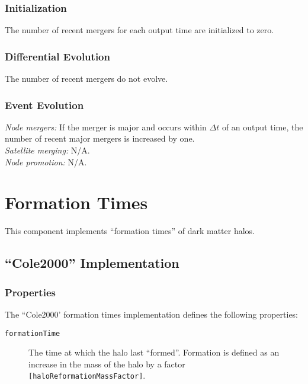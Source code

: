 \subsubsection{Initialization}

The number of recent mergers for each output time are initialized to zero.

\subsubsection{Differential Evolution}

The number of recent mergers do not evolve.

\subsubsection{Event Evolution}

\noindent\emph{Node mergers:} If the merger is major and occurs within $\Delta t$ of an output time, the number of recent major mergers is increased by one.\\

\noindent\emph{Satellite merging:} N/A.\\

\noindent\emph{Node promotion:} N/A.\\

\section{Formation Times}\label{sec:ComponentFormationTimes}

This \gls{component} implements ``formation times'' of dark matter halos.

\subsection{``Cole2000'' Implementation}

\subsubsection{Properties}

The ``Cole2000' formation times implementation defines the following properties:
\begin{description}
 \item [{\tt formationTime}] The time at which the halo last ``formed''. Formation is defined as an increase in the mass of the halo by a factor {\tt [haloReformationMassFactor]}.
\end{description}

